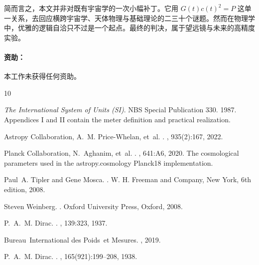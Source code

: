 \documentclass[12pt,leqno]{article}
\begin{document}
	\bigskip
	简而言之，本文并非对既有宇宙学的一次小幅补丁。它用 $G(t)c(t)^2=P$ 这单一关系，去回应横跨宇宙学、天体物理与基础理论的二三十个谜题。然而在物理学中，优雅的逻辑自洽只不过是一个起点。最终的判决，属于望远镜与未来的高精度实验。

	
	\vskip 0.5in
	\paragraph{资助：}本工作未获得任何资助。
	
	
	\vskip 0.5in
	
	\begin{thebibliography}{10}
		
		{\em The International System of Units (SI)}.
		\newblock NBS Special Publication 330. 1987.
		\newblock Appendices I and II contain the meter definition and practical
		realization.
		
		Astropy Collaboration, A.~M. Price-Whelan, et~al.
		.
		, 935(2):167, 2022.
		
		Planck Collaboration, N.~Aghanim, et~al.
		.
		, 641:A6, 2020.
		\newblock The cosmological parameters used in the astropy.cosmology Planck18
		implementation.
		
		Paul~A. Tipler and Gene Mosca.
		.
		\newblock W. H. Freeman and Company, New York, 6th edition, 2008.
		
		Steven Weinberg.
		.
		\newblock Oxford University Press, Oxford, 2008.
		
		P.~A.~M. Dirac.
		.
		, 139:323, 1937.
		
		Bureau~International des Poids~et Mesures.
		, 2019.
		
		P.~A.~M. Dirac.
		.
		, 165(921):199--208, 1938.
		

\end{thebibliography}
\end{document}
